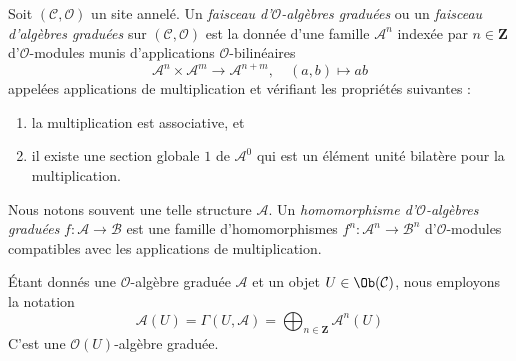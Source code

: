 \begin{definition}
\label{definition-ga}
Soit $(\mathcal{C}, \mathcal{O})$ un site annelé. Un
{\it faisceau d'$\mathcal{O}$-algèbres graduées}
ou un {\it faisceau d'algèbres graduées} sur $(\mathcal{C}, \mathcal{O})$
est la donnée d'une famille $\mathcal{A}^n$ indexée par $n \in \mathbf{Z}$
d'$\mathcal{O}$-modules munis d'applications $\mathcal{O}$-bilinéaires
$$
\mathcal{A}^n \times \mathcal{A}^m \to \mathcal{A}^{n + m},\quad
(a, b) \longmapsto ab
$$
appelées applications de multiplication et vérifiant les propriétés suivantes :
\begin{enumerate}
\item la multiplication est associative, et
\item il existe une section globale $1$ de $\mathcal{A}^0$
qui est un élément unité bilatère pour la multiplication.
\end{enumerate}
Nous notons souvent une telle structure $\mathcal{A}$.
Un {\it homomorphisme d'$\mathcal{O}$-algèbres graduées}
$f : \mathcal{A} \to \mathcal{B}$ est une famille d'homomorphismes
$f^n : \mathcal{A}^n \to \mathcal{B}^n$
d'$\mathcal{O}$-modules compatibles avec les applications de multiplication.
\end{definition}

\noindent
Étant donnés une $\mathcal{O}$-algèbre graduée $\mathcal{A}$
et un objet $U \in \Ob(\mathcal{C})$, nous employons la
notation $$
\mathcal{A}(U)
= \Gamma(U, \mathcal{A})
= \bigoplus\nolimits_{n \in \mathbf{Z}} \mathcal{A}^n(U)
$$
C'est une $\mathcal{O}(U)$-algèbre graduée.

